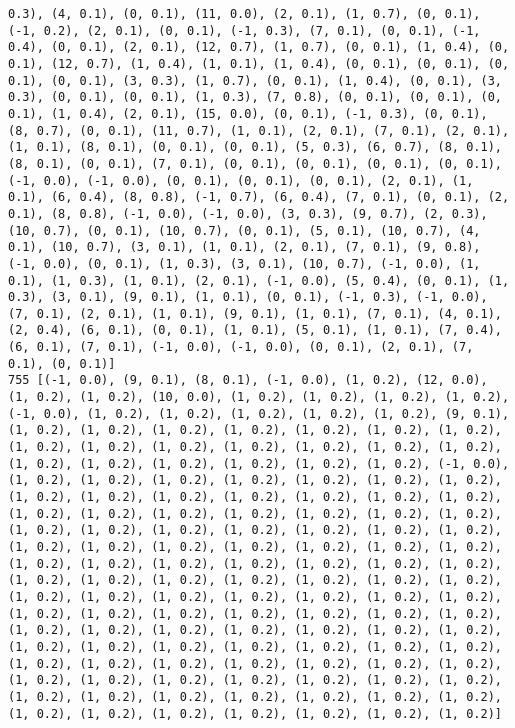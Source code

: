 \documentclass[11pt]{article}
\begin{document}
\begin{Verbatim}[commandchars=\\\{\}]
0.3), (4, 0.1), (0, 0.1), (11, 0.0), (2, 0.1), (1, 0.7), (0, 0.1), (-1, 0.2), (2, 0.1), (0, 0.1), (-1, 0.3), (7, 0.1), (0, 0.1), (-1, 0.4), (0, 0.1), (2, 0.1), (12, 0.7), (1, 0.7), (0, 0.1), (1, 0.4), (0, 0.1), (12, 0.7), (1, 0.4), (1, 0.1), (1, 0.4), (0, 0.1), (0, 0.1), (0, 0.1), (0, 0.1), (3, 0.3), (1, 0.7), (0, 0.1), (1, 0.4), (0, 0.1), (3, 0.3), (0, 0.1), (0, 0.1), (1, 0.3), (7, 0.8), (0, 0.1), (0, 0.1), (0, 0.1), (1, 0.4), (2, 0.1), (15, 0.0), (0, 0.1), (-1, 0.3), (0, 0.1), (8, 0.7), (0, 0.1), (11, 0.7), (1, 0.1), (2, 0.1), (7, 0.1), (2, 0.1), (1, 0.1), (8, 0.1), (0, 0.1), (0, 0.1), (5, 0.3), (6, 0.7), (8, 0.1), (8, 0.1), (0, 0.1), (7, 0.1), (0, 0.1), (0, 0.1), (0, 0.1), (0, 0.1), (-1, 0.0), (-1, 0.0), (0, 0.1), (0, 0.1), (0, 0.1), (2, 0.1), (1, 0.1), (6, 0.4), (8, 0.8), (-1, 0.7), (6, 0.4), (7, 0.1), (0, 0.1), (2, 0.1), (8, 0.8), (-1, 0.0), (-1, 0.0), (3, 0.3), (9, 0.7), (2, 0.3), (10, 0.7), (0, 0.1), (10, 0.7), (0, 0.1), (5, 0.1), (10, 0.7), (4, 0.1), (10, 0.7), (3, 0.1), (1, 0.1), (2, 0.1), (7, 0.1), (9, 0.8), (-1, 0.0), (0, 0.1), (1, 0.3), (3, 0.1), (10, 0.7), (-1, 0.0), (1, 0.1), (1, 0.3), (1, 0.1), (2, 0.1), (-1, 0.0), (5, 0.4), (0, 0.1), (1, 0.3), (3, 0.1), (9, 0.1), (1, 0.1), (0, 0.1), (-1, 0.3), (-1, 0.0), (7, 0.1), (2, 0.1), (1, 0.1), (9, 0.1), (1, 0.1), (7, 0.1), (4, 0.1), (2, 0.4), (6, 0.1), (0, 0.1), (1, 0.1), (5, 0.1), (1, 0.1), (7, 0.4), (6, 0.1), (7, 0.1), (-1, 0.0), (-1, 0.0), (0, 0.1), (2, 0.1), (7, 0.1), (0, 0.1)]
755 [(-1, 0.0), (9, 0.1), (8, 0.1), (-1, 0.0), (1, 0.2), (12, 0.0), (1, 0.2), (1, 0.2), (10, 0.0), (1, 0.2), (1, 0.2), (1, 0.2), (1, 0.2), (-1, 0.0), (1, 0.2), (1, 0.2), (1, 0.2), (1, 0.2), (1, 0.2), (9, 0.1), (1, 0.2), (1, 0.2), (1, 0.2), (1, 0.2), (1, 0.2), (1, 0.2), (1, 0.2), (1, 0.2), (1, 0.2), (1, 0.2), (1, 0.2), (1, 0.2), (1, 0.2), (1, 0.2), (1, 0.2), (1, 0.2), (1, 0.2), (1, 0.2), (1, 0.2), (1, 0.2), (-1, 0.0), (1, 0.2), (1, 0.2), (1, 0.2), (1, 0.2), (1, 0.2), (1, 0.2), (1, 0.2), (1, 0.2), (1, 0.2), (1, 0.2), (1, 0.2), (1, 0.2), (1, 0.2), (1, 0.2), (1, 0.2), (1, 0.2), (1, 0.2), (1, 0.2), (1, 0.2), (1, 0.2), (1, 0.2), (1, 0.2), (1, 0.2), (1, 0.2), (1, 0.2), (1, 0.2), (1, 0.2), (1, 0.2), (1, 0.2), (1, 0.2), (1, 0.2), (1, 0.2), (1, 0.2), (1, 0.2), (1, 0.2), (1, 0.2), (1, 0.2), (1, 0.2), (1, 0.2), (1, 0.2), (1, 0.2), (1, 0.2), (1, 0.2), (1, 0.2), (1, 0.2), (1, 0.2), (1, 0.2), (1, 0.2), (1, 0.2), (1, 0.2), (1, 0.2), (1, 0.2), (1, 0.2), (1, 0.2), (1, 0.2), (1, 0.2), (1, 0.2), (1, 0.2), (1, 0.2), (1, 0.2), (1, 0.2), (1, 0.2), (1, 0.2), (1, 0.2), (1, 0.2), (1, 0.2), (1, 0.2), (1, 0.2), (1, 0.2), (1, 0.2), (1, 0.2), (1, 0.2), (1, 0.2), (1, 0.2), (1, 0.2), (1, 0.2), (1, 0.2), (1, 0.2), (1, 0.2), (1, 0.2), (1, 0.2), (1, 0.2), (1, 0.2), (1, 0.2), (1, 0.2), (1, 0.2), (1, 0.2), (1, 0.2), (1, 0.2), (1, 0.2), (1, 0.2), (1, 0.2), (1, 0.2), (1, 0.2), (1, 0.2), (1, 0.2), (1, 0.2), (1, 0.2), (1, 0.2), (1, 0.2), (1, 0.2), (1, 0.2), (1, 0.2), (1, 0.2), (1, 0.2)]

\end{Verbatim}
\end{document}
